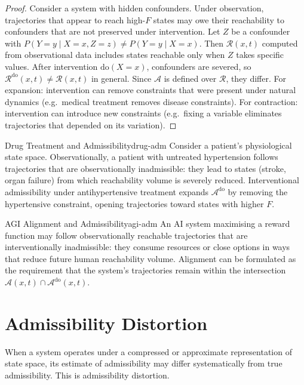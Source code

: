\documentclass[12pt,twoside,openright]{book}
\newcommand{\csicon} {\marginpar{\tiny\color{DistBlue}\faCode}}
\newcommand{\bioicon}{\marginpar{\tiny\color{DistTeal}\faDna}}
\newcommand{\reach}{\mathcal{R}}
\newcommand{\adm}{\mathcal{A}}
\begin{document}
\begin{proof}
  Consider a system with hidden confounders. Under
  observation, trajectories that appear to reach high-$F$
  states may owe their reachability to confounders that are
  not preserved under intervention. Let $Z$ be a confounder
  with $P(Y=y\mid X=x,Z=z) \ne P(Y=y\mid X=x)$. Then
  $\reach(x,t)$ computed from observational data includes
  states reachable only when $Z$ takes specific values.
  After intervention $\mathrm{do}(X=x)$, confounders are
  severed, so $\reach^\mathrm{do}(x,t) \ne \reach(x,t)$ in
  general. Since $\adm$ is defined over $\reach$, they
  differ. For expansion: intervention can remove constraints
  that were present under natural dynamics (e.g.\ medical
  treatment removes disease constraints). For contraction:
  intervention can introduce new constraints (e.g.\ fixing
  a variable eliminates trajectories that depended on its
  variation).
\end{proof}

\begin{example}{Drug Treatment and Admissibility}{drug-adm}
  \bioicon
  Consider a patient's physiological state space.
  Observationally, a patient with untreated hypertension
  follows trajectories that are observationally
  inadmissible: they lead to states (stroke, organ failure)
  from which reachability volume is severely reduced.
  Interventional admissibility under antihypertensive
  treatment expands $\adm^\mathrm{do}$ by removing the
  hypertensive constraint, opening trajectories toward
  states with higher $F$.
\end{example}

\begin{example}{AGI Alignment and Admissibility}{agi-adm}
  \csicon
  An AI system maximising a reward function may follow
  observationally reachable trajectories that are
  interventionally inadmissible: they consume resources or
  close options in ways that reduce future human
  reachability volume. Alignment can be formulated as the
  requirement that the system's trajectories remain within
  the intersection $\adm(x,t)\cap\adm^\mathrm{do}(x,t)$.
\end{example}

\section{Admissibility Distortion}
\label{sec:ch14-distortion}

When a system operates under a compressed or approximate
representation of state space, its estimate of
admissibility may differ systematically from true
admissibility. This is admissibility distortion.
\end{document}
